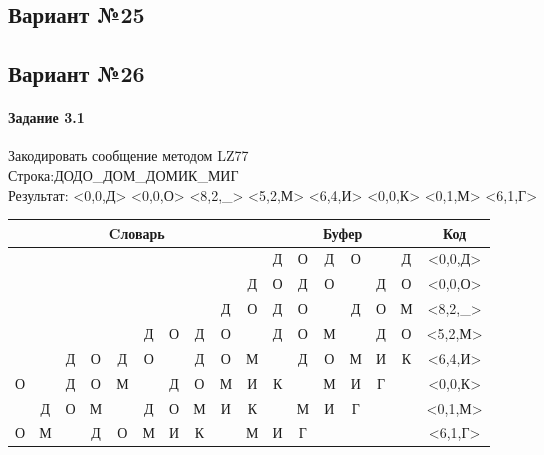 \documentclass[a4paper, 12pt]{article}
\begin{document}
\pagebreak
\subsection{Вариант №25}

\pagebreak
\subsection{Вариант №26}
\paragraph{Задание 3.1}

Закодировать сообщение методом LZ77\\
Строка:ДОДО\_ДОМ\_ДОМИК\_МИГ\\
Результат: <0,0,Д> <0,0,О> <8,2,\_> <5,2,М> <6,4,И> <0,0,К> <0,1,М> <6,1,Г>\\
\begin{table}[h!]
\centering
\begin{tabular}{|c|c|c|c|c|c|c|c|c|c|c|c|c|c|c|c|c|} 
\hline
\multicolumn{10}{|c|}{Cловарь} & \multicolumn{6}{c|}{Буфер} & Код  \\ \hline
  &   &   &   &   &   &   &   &   &   & \cellcolor[HTML]{8CE4F6} Д & О & Д & О &   & Д & <0,0,Д>
\\ \hline
  &   &   &   &   &   &   &   &   & Д & \cellcolor[HTML]{8CE4F6} О & Д & О &   & Д & О & <0,0,О>
\\ \hline
  &   &   &   &   &   &   &   & \cellcolor[HTML]{FFFF00} Д & \cellcolor[HTML]{FFFF00} О & \cellcolor[HTML]{FFFF00} Д & \cellcolor[HTML]{FFFF00} О & \cellcolor[HTML]{8CE4F6}   & Д & О & М & <8,2,\_>
\\ \hline
  &   &   &   &   & \cellcolor[HTML]{FFFF00} Д & \cellcolor[HTML]{FFFF00} О & Д & О &   & \cellcolor[HTML]{FFFF00} Д & \cellcolor[HTML]{FFFF00} О & \cellcolor[HTML]{8CE4F6} М &   & Д & О & <5,2,М>
\\ \hline
  &   & Д & О & Д & О & \cellcolor[HTML]{FFFF00}   & \cellcolor[HTML]{FFFF00} Д & \cellcolor[HTML]{FFFF00} О & \cellcolor[HTML]{FFFF00} М & \cellcolor[HTML]{FFFF00}   & \cellcolor[HTML]{FFFF00} Д & \cellcolor[HTML]{FFFF00} О & \cellcolor[HTML]{FFFF00} М & \cellcolor[HTML]{8CE4F6} И & К & <6,4,И>
\\ \hline
О &   & Д & О & М &   & Д & О & М & И & \cellcolor[HTML]{8CE4F6} К &   & М & И & Г &   & <0,0,К>
\\ \hline
\cellcolor[HTML]{FFFF00}   & Д & О & М &   & Д & О & М & И & К & \cellcolor[HTML]{FFFF00}   & \cellcolor[HTML]{8CE4F6} М & И & Г &   &   & <0,1,М>
\\ \hline
О & М &   & Д & О & М & \cellcolor[HTML]{FFFF00} И & К &   & М & \cellcolor[HTML]{FFFF00} И & \cellcolor[HTML]{8CE4F6} Г &   &   &   &   & <6,1,Г>
\\ \hline
\end{tabular}
\end{table}
\end{document}
